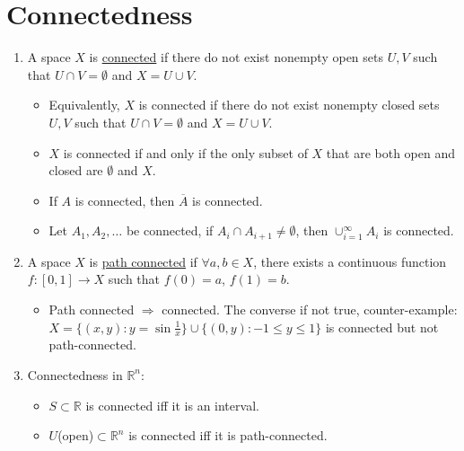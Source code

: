 \documentclass[%
 aip,
 jmp,%
 amsmath,amssymb,
 reprint,%
]{revtex4-1}
\def\R{{\mathbb R}}
\def\Ra{\Rightarrow}
\renewenvironment{proof}{\color{gray}\footnotesize\emph{Proof.}}{}
\newcommand{\defn}[1]{\underline{#1}}
\begin{document}
\section{Connectedness}
\begin{enumerate}
    \item A space $X$ is \defn{connected} if there do not exist nonempty open sets
    $U,V$ such that $U \cap V = \emptyset$ and $X = U \cup V$.
        \begin{itemize}
            \item Equivalently, $X$ is connected if there do not exist nonempty
            closed sets $U,V$ such that $U \cap V = \emptyset$ and $X = U \cup V$.
            \item $X$ is connected if and only if the only subset of $X$ that are
            both open and closed are $\emptyset$ and $X$.
            \item If $A$ is connected, then $\overline{A}$ is connected.
            \item Let $A_1, A_2, \dots$ be connected, if $A_i \cap A_{i+1} \neq \emptyset$,
            then $\cup_{i=1}^{\infty} A_i$ is connected.
        \end{itemize}

    \item A space $X$ is \defn{path connected} if $\forall a,b \in X$, there exists
    a continuous function $f: [0,1]\to X$ such that $f(0)=a$, $f(1)=b$.
        \begin{itemize}
            \item Path connected $\Ra$ connected.
            {\footnotesize\color{gray} The converse if not true,  counter-example:
            $X=\{(x,y): y=\sin \frac{1}{x}\} \cup \{(0,y): -1\le y\le 1\}$ is
            connected but not path-connected.}
        \end{itemize}

    \item Connectedness in $\R^n$:
        \begin{itemize}
            \item $S\subset\R$ is connected iff it is an interval.
            \item $U$(open)$\subset\R^n$ is connected iff it is path-connected.\\
        \end{itemize}


\end{enumerate}
\end{document}
